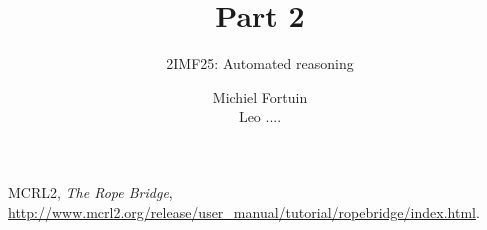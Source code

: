 \documentclass[11pt,a4paper]{report}
\title{Part 2}
\subtitle{2IMF25: Automated reasoning}
\author{Michiel Fortuin\\Leo ....}
\begin{document}
\maketitle

\setcounter{tocdepth}{1}
\tableofcontents





\begin{thebibliography}{9}
	
	MCRL2,
	\emph{The Rope Bridge},
	\url{http://www.mcrl2.org/release/user_manual/tutorial/ropebridge/index.html}.
	
\end{thebibliography}
\end{document}

